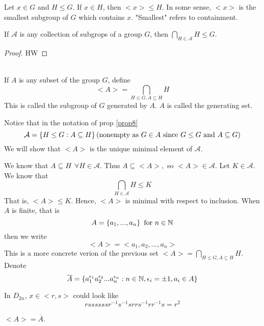 Let $ x\in G$ and $H \leq G$. If $x \in H$, then $<x> \leq H$. In some sense, $<x>$ is the smallest subgroup of $G$ which contains $x$. "Smallest" refers to containment.

\begin{proposition}
    \label{prop8}
    If $\mathcal{A}$ is any collection of subgrops of a group $G$, then $\bigcap \limits_{H \in \mathcal{A}} H \leq G.$
\end{proposition}

\begin{proof}
    HW
\end{proof}

\begin{definition} \leavevmode \\
    If $A$ is any subset of the group $G$, define
    $$<A> = \bigcap \limits_{H \leq G, A \subseteq H} H$$
    This is called the subgroup of $G$ generated by $A$. $A$ is called the generating set. 
\end{definition}

Notice that in the notation of prop \ref{prop8}
$$\mathcal{A} = \left\{H \leq G : A \subseteq H\right\} \text{(nonempty as $G \in A$ since $G\leq G$ and $A \subseteq G$)}$$
We will show that $<A> $ is the unique minimal element of $\mathcal{A}$.

We know that $A \subseteq H ~~\forall H \in \mathcal{A}.$ Thus $A \subseteq <A>, $ so $<A> \in \mathcal{A}$.
Let $K \in \mathcal{A}.$ We know that 
$$\bigcap \limits_{H\in \mathcal{A}} H \leq K$$
That is, $<A> \leq K.$ Hence, $<A>$ is minimal with respect to inclusion. When $A$ is finite, that is
$$A = \left\{a_1, ..., a_n\right\} \text{ for } n \in \mathbb{N}$$
then we write 
$$<A> = <a_1, a_2, ..., a_n>$$
This is a more concrete verion of the previous set $<A> = \bigcap \limits_{H \leq G, A \subseteq H} H.$
Denote
$$\overline{A} = \left\{a_1^{\epsilon_1} a_2^{\epsilon_2} ... a_n^{\epsilon_n} : n \in \mathbb{N}, \epsilon_i = \pm 1, a_i \in A\right\}$$

In $D_{2n}$, $x \in <r,s>$ could look like
$$rssssssr^{-1}s^{-1}srrs^{-1}rr^{-1}s = r^2$$

\begin{proposition}
    $<A> = \overline{A}$.
\end{proposition}